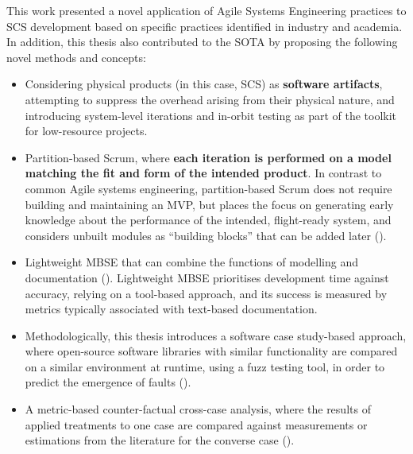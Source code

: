 \documentclass[a4paper,nobib,justified,final]{tufte-book}
\begin{document}
\begin{fullwidth}
This work presented a novel application of Agile Systems Engineering practices to \acs{SCS} development based on specific practices identified in industry and academia. In addition, this thesis also contributed to the \acl{SOTA} by proposing the following novel methods and concepts:
\begin{itemize}[itemsep=-1pt]
	\item Considering physical products (in this case, \acs{SCS}) as \textbf{software artifacts}, attempting to suppress the overhead arising from their physical nature, and introducing system-level iterations and in-orbit testing as part of the toolkit for low-resource projects.
	\item Partition-based Scrum, where \textbf{each iteration is performed on a model matching the fit and form of the intended product}. In contrast to common Agile systems engineering, partition-based Scrum does not require building and maintaining an \acl{MVP}, but places the focus on generating early knowledge about the performance of the intended, flight-ready system, and considers unbuilt modules as ``building blocks'' that can be added later ().
	\item Lightweight \acs{MBSE} that can combine the functions of modelling and documentation (). Lightweight \acs{MBSE} prioritises development time against accuracy, relying on a tool-based approach, and its success is measured by metrics typically associated with text-based documentation.
	\item Methodologically, this thesis introduces a software case study-based approach, where open-source software libraries with similar functionality are compared on a similar environment at runtime, using a fuzz testing tool, in order to predict the emergence of faults ().
	\item A metric-based counter-factual cross-case analysis, where the results of applied treatments to one case are compared against measurements or estimations from the literature for the converse case ().
\end{itemize}


\end{fullwidth}
\end{document}
